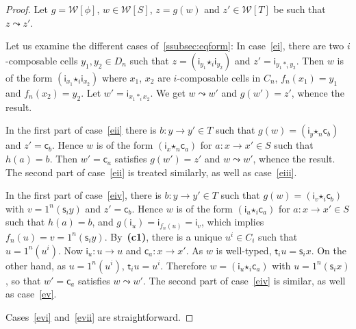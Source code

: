 \documentclass[reqno]{amsart}
\theoremstyle{plain}
\theoremstyle{definition}
\theoremstyle{remark}
\newcommand{\source}{\mathsf{s}} %
\newcommand{\target}{\mathsf{t}} %
\newcommand{\unit}[1]{1^{#1}} %
\newcommand{\comp}[1]{\ast_{#1}} %
\newcommand{\sce}[1]{\source_{#1}} %
\newcommand{\tge}[1]{\target_{#1}} %
\newcommand{\WW}{\mathcal{W}}
\newcommand{\wtx}[1]{\WW[#1]} %
\newcommand{\formal}[1]{\mathsf{#1}} %
\newcommand{\fcst}[1]{\formal{c}_{#1}} %
\newcommand{\fid}[1]{\formal{i}_{#1}} %
\newcommand{\fcomp}[1]{\bm{\star}_{#1}} %
\newcommand{\frel}{\leadsto} %
\newcommand{\cndi}{\textbf{(c1)}} %
\begin{document}
 \begin{proof}
   Let $g=\wtx\phi$, $w\in\wtx S$, $z=g(w)$ and $z'\in\wtx T$ be such that
   $z\frel z'$.

   Let us examine the different cases of~\ref{ssubsec:eqform}:
  In case~\ref{ei}, there are two $i$-composable cells $y_1,y_2\in D_n$ such that
  $z=(\fid{y_1}\fcomp i \fid{y_2})$ and $z'=\fid{y_1\comp i
    y_2}$. Then $w$ is of the form $(\fid{x_1}\fcomp i\fid{x_2})$ where
  $x_1$, $x_2$ are $i$-composable cells in $C_n$,
  $f_n(x_1)=y_1$ and $f_n(x_2)=y_2$. Let $w'=\fid{x_1\comp i
    x_2}$. We get $w\frel w'$ and $g(w')=z'$, whence the result.
  
In the first part of case~\ref{eii}  there is $b:y\to y'\in T$ such that $g(w)=(\fid y\fcomp n
\fcst b)$ and $z'=\fcst b$. Hence $w$ is of the form $(\fid x\fcomp n\fcst a)$ for
$a:x\to x'\in S$ such that $h(a)=b$. Then $w'=\fcst a$ satisfies
$g(w')=z'$ and $w\frel w'$, whence the result.
The second part of case~\ref{eii} is treated similarly, as well as
case~\ref{eiii}.

In the first part of case~\ref{eiv}, there is $b:y\to y'\in T$ such that
$g(w)=(\fid v\fcomp i \fcst b)$ with $v=\unit n(\sce i y)$ and
$z'=\fcst b$. Hence $w$ is of the form $(\fid u\fcomp i\fcst a)$ for
$a:x\to x'\in S$ such that $h(a)=b$, and $g(\fid u)=\fid{f_n(u)}=\fid
v$, which implies $f_n(u)=v=\unit n(\sce i y)$. By~\cndi, there is a unique
$u^i\in C_i$ such that $u=\unit n(u^i)$. Now $\fid u:u\to u$ and
$\fcst a:x\to x'$. As $w$
is well-typed, $\tge i u=\sce i x$. On the other hand, as
$u=\unit{n}(u^i)$, $\tge i u=u^i$. Therefore $w=(\fid u\fcomp i \fcst a)$
with $u=\unit n(\sce i x)$, so that $w'=\fcst a$ satisfies $w\frel
w'$. The second part of case~\ref{eiv} is similar, as well as case~\ref{ev}.

Cases~\ref{evi} and~\ref{evii} are straightforward.


\end{proof}
\end{document}
